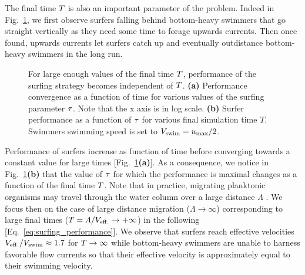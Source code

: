 The final time $\FinalTime$ is also an important parameter of the problem. 
Indeed in Fig.~\ref{fig:taylor_green_vortex_time_performance_tau_and_tau_performance_final_time}, we first observe surfers falling behind bottom-heavy swimmers that go straight vertically as they need some time to forage upwards currents.
Then once found, upwards currents let surfers catch up and eventually outdistance bottom-heavy swimmers in the long run.
\begin{figure}%
	\centering
	
	\caption[For large enough values of the final time $\FinalTime$, performance of the surfing strategy becomes independent of $\FinalTime$.]{
		For large enough values of the final time $\FinalTime$, performance of the surfing strategy becomes independent of $\FinalTime$.
		\textbf{(a)} Performance convergence as a function of time for various values of the surfing parameter $\tau$.
		Note that the x axis is in log scale.
		\textbf{(b)} Surfer performance as a function of $\tau$ for various final simulation time $T$.
		Swimmers swimming speed is set to $V_{\mathrm{swim}} = u_{\mathrm{max}}/2$.
	}
	\label{fig:taylor_green_vortex_time_performance_tau_and_tau_performance_final_time}
\end{figure}
Performance of surfers increase as function of time before converging towards a constant value for large times [Fig.~\ref{fig:taylor_green_vortex_time_performance_tau_and_tau_performance_final_time}\textbf{(a)}].
As a consequence, we notice in Fig.~\ref{fig:taylor_green_vortex_time_performance_tau_and_tau_performance_final_time}\textbf{(b)} that the value of $\tau$ for which the performance is maximal changes as a function of the final time $\FinalTime$.
Note that in practice, migrating planktonic organisms may travel through the water column over a large distance $\varLambda$ \citep{hardy1954experimental, williamson2011toward, prairie2012biophysical}.
We focus then on the case of large distance migration ($\varLambda \to \infty$) corresponding to large final times ($T = \varLambda/V_{\mathrm{eff.}} \to +\infty$) in the following [Eq.~\eqref{eq:surfing_performance}].
We observe that surfers reach effective velocities $V_{\mathrm{eff.}}/V_{\mathrm{swim}} \approx 1.7$ for $T \to \infty$ while bottom-heavy swimmers are unable to harness favorable flow currents so that their effective velocity is approximately equal to their swimming velocity.

